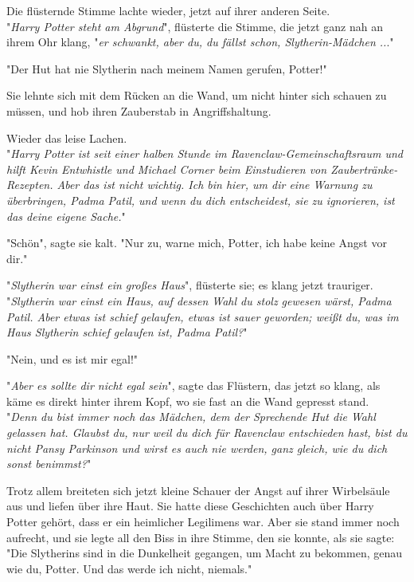 {Die flüsternde Stimme lachte wieder, jetzt auf ihrer anderen Seite.\\ "\emph{Harry Potter steht am Abgrund}", flüsterte die Stimme, die jetzt ganz nah an ihrem Ohr klang, "\emph{er schwankt, aber du, du fällst schon, Slytherin-Mädchen ..}."

"Der Hut hat nie Slytherin nach meinem Namen gerufen, Potter!"

Sie lehnte sich mit dem Rücken an die Wand, um nicht hinter sich schauen zu müssen, und hob ihren Zauberstab in Angriffshaltung.

Wieder das leise Lachen.\\ "\emph{Harry Potter ist seit einer halben Stunde im Ravenclaw-Gemeinschaftsraum und hilft Kevin Entwhistle und Michael Corner beim Einstudieren von Zaubertränke-Rezepten. Aber das ist nicht wichtig. Ich bin hier, um dir eine Warnung zu überbringen, Padma Patil, und wenn du dich entscheidest, sie zu ignorieren, ist das deine eigene Sache.}"

"Schön", sagte sie kalt. "Nur zu, warne mich, Potter, ich habe keine Angst vor dir."

"\emph{Slytherin war einst ein großes Haus}", flüsterte sie; es klang jetzt trauriger.\\ "\emph{Slytherin war einst ein Haus, auf dessen Wahl du stolz gewesen wärst, Padma Patil. Aber etwas ist schief gelaufen, etwas ist sauer geworden; weißt du, was im Haus Slytherin schief gelaufen ist, Padma Patil?}"

"Nein, und es ist mir egal!"

"\emph{Aber es sollte dir nicht egal sein}", sagte das Flüstern, das jetzt so klang, als käme es direkt hinter ihrem Kopf, wo sie fast an die Wand gepresst stand.\\ "\emph{Denn du bist immer noch das Mädchen, dem der Sprechende Hut die Wahl gelassen hat. Glaubst du, nur weil du dich für Ravenclaw entschieden hast, bist du nicht Pansy Parkinson und wirst es auch nie werden, ganz gleich, wie du dich sonst benimmst?}"

Trotz allem breiteten sich jetzt kleine Schauer der Angst auf ihrer Wirbelsäule aus und liefen über ihre Haut. Sie hatte diese Geschichten auch über Harry Potter gehört, dass er ein heimlicher Legilimens war. Aber sie stand immer noch aufrecht, und sie legte all den Biss in ihre Stimme, den sie konnte, als sie sagte:\\ "Die Slytherins sind in die Dunkelheit gegangen, um Macht zu bekommen, genau wie du, Potter. Und das werde ich nicht, niemals."

}
